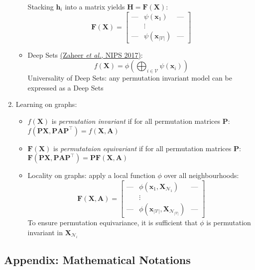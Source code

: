 \documentclass{article}
\begin{document}
\begin{enumerate}
\begin{itemize}[topsep=0pt]
		Stacking $\mathbf{h}_i$ into a matrix yields $\mathbf{H}=\bm{F}(\mathbf{X})$:
		$$\bm{F}(\mathbf{X})=\begin{bmatrix}
			\text{---} & \!\!\!\psi(\mathbf{x}_1) & \!\!\!\text{{--}{--}} \\ 
			{} & \vdots & {} \\
			\text{{--}{--}} & \!\!\!\psi(\mathbf{x}_{|\mathcal{V}|}) & \!\!\!\text{{--}{--}}
		\end{bmatrix}$$
		\item Deep Sets \href{https://papers.nips.cc/paper/2017/file/f22e4747da1aa27e363d86d40ff442fe-Paper.pdf}{(Zaheer \textit{et al.}, NIPS 2017)}: 
		$$f(\mathbf{X})=\phi\left(\bigoplus_{i\in\mathcal{V}}\psi(\mathbf{x}_i)\right)$$
		Universality of Deep Sets: any permutation invariant model can be expressed as a Deep Sets
	\end{itemize}

	\item Learning on graphs:
	\begin{itemize}[topsep=0pt]
		\item $f(\mathbf{X})$ is \textit{permutation invariant} if for all permutation matrices $\mathbf{P}$: $f(\mathbf{PX},\mathbf{PA}\mathbf{P}^\top)=f(\mathbf{X},\mathbf{A})$
		\item $\bm{F}(\mathbf{X})$ is \textit{permutataion equivariant} if for all permutation matrices $\mathbf{P}$: $\bm{F}(\mathbf{PX},\mathbf{PA}\mathbf{P}^\top)=\mathbf{P}\bm{F}(\mathbf{X},\mathbf{A})$ 
		\item Locality on graphs: apply a local function $\phi$ over all neighbourhoods:
		$$\bm{F}(\mathbf{X},\mathbf{A})=\begin{bmatrix}
			\text{---} & \!\!\!\phi(\mathbf{x}_1,\mathbf{X}_{\mathcal{N}_1}) & \!\!\!\text{{--}{--}} \\ 
			{} & \vdots & {} \\
			\text{{--}{--}} & \!\!\!\phi(\mathbf{x}_{|\mathcal{V}|},\mathbf{X}_{\mathcal{N}_{|\mathcal{V}|}}) & \!\!\!\text{{--}{--}}
		\end{bmatrix}$$
		To ensure permutation equivariance, it is sufficient that $\phi$ is permutation invariant in $\mathbf{X}_{\mathcal{N}_i}$
	\end{itemize}
\end{enumerate}

\newpage

\subsection*{Appendix: Mathematical Notations}
\end{document}
